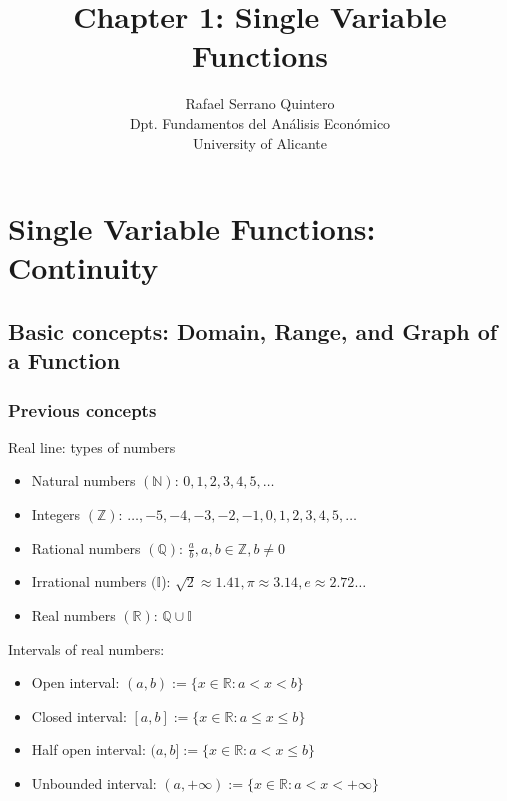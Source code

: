 \documentclass[a4paper,11pt]{article}
\title{Chapter 1: Single Variable Functions}
\author{Rafael Serrano Quintero \\
Dpt. Fundamentos del An\'alisis Econ\'omico \\
University of Alicante}
\date{}
\theoremstyle{definition}
\theoremstyle{plain}
\begin{document}
      

\maketitle

    
\section{Single Variable Functions:
Continuity}\label{single-variable-functions-continuity}


\subsection{Basic concepts: Domain, Range, and Graph of a
Function}\label{basic-concepts-domain-range-and-graph-of-a-function}

\subsubsection{Previous concepts}\label{previous-concepts}

Real line: types of numbers 

\begin{itemize}
	\item Natural numbers \((\mathbb{N})\): \(0,1,2,3,4,5,\ldots\) 
	\item Integers \((\mathbb{Z})\): \(\ldots,-5,-4,-3,-2,-1,0,1,2,3,4,5,\ldots\) 
	\item Rational numbers \((\mathbb{Q})\): \(\frac{a}{b},a,b\in\mathbb{Z},b\neq 0\) 
	\item Irrational numbers \((\mathbb{I}\)): \(\sqrt{2}\approx 1.41, \pi\approx 3.14,e \approx 2.72\ldots\) 
	\item Real numbers \((\mathbb{R})\): \(\mathbb{Q}\cup\mathbb{I}\)
\end{itemize}

Intervals of real numbers:

\begin{itemize}
\item
  Open interval: \((a,b) := \{x\in\mathbb{R}:a<x<b\}\)
\item
  Closed interval: \([a,b] := \{x\in\mathbb{R}:a\leq x\leq b\}\)
\item
  Half open interval: \((a,b] := \{x\in\mathbb{R} : a<x\leq b\}\)
\item
  Unbounded interval:
  \((a,+\infty) := \{x\in\mathbb{R} : a < x < +\infty\}\)
\end{itemize}
\end{document}
